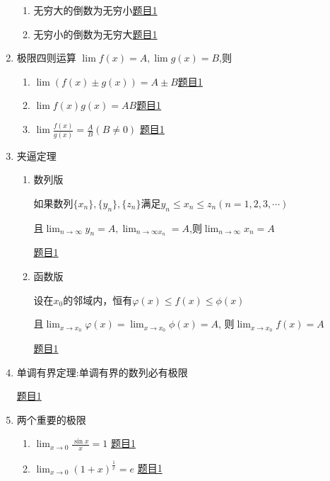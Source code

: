 \documentclass[12pt]{article} %
\begin{document}
\begin{enumerate}
\begin{enumerate}
        \item 无穷大的倒数为无穷小\quad \href{https://www.matongxue.com/matex/2596/react/}{题目1}
        \item 无穷小的倒数为无穷大\quad \href{https://www.matongxue.com/matex/2597/react/}{题目1}
    \end{enumerate}
\item 极限四则运算
    $\lim f(x)=A,\lim g(x)=B$,则
    \begin{enumerate}
        \item $\lim (f(x) \pm g(x))=A \pm B$\quad \href{https://www.matongxue.com/matex/2598/react/}{题目1}
        \item $\lim f(x)g(x)=AB$\quad \href{https://www.matongxue.com/matex/2599/react/}{题目1}
        \item $\displaystyle\lim \frac{f(x)}{g(x)}=\frac{A}{B}(B \neq 0)$
        \quad \href{https://www.matongxue.com/matex/2600/react/}{题目1}
    \end{enumerate}
\item 夹逼定理
    \begin{enumerate} 
        \item 数列版
        \par 如果数列$\{x_n\},\{y_n\},\{z_n\}$满足$y_n\leq x_n \leq z_n(n=1,2,3,\cdots)$
        \par 且$\displaystyle\lim_{n\to\infty}y_n=A,\lim_{n\to\infty x_n}=A$,则$\displaystyle\lim_{n\to\infty}x_n=A$
        \par \href{https://www.matongxue.com/matex/2602/react/}{题目1}
        \item 函数版
        \par 设在$x_0$的邻域内，恒有$\varphi(x)\leq f(x) \leq \phi(x)$
        \par 且$\displaystyle\lim_{x\to x_0}\varphi(x)=\lim_{x\to x_0}\phi(x)=A$,
        则$\displaystyle\lim_{x\to x_0}f(x)=A$
        \par \href{https://www.matongxue.com/matex/2601/react/}{题目1}
    \end{enumerate}
\item 单调有界定理:单调有界的数列必有极限
    \par \href{https://www.matongxue.com/matex/2603/react/}{题目1}
\item 两个重要的极限
    \begin{enumerate}
        \item $\displaystyle\lim_{x\to 0}\frac{\sin x}{x}=1$
        \quad \href{https://www.matongxue.com/matex/2604/react/}{题目1}
        \item $\displaystyle\lim_{x\to 0}(1+x)^{\frac{1}{x}}=e$
        \quad \href{https://www.matongxue.com/matex/2605/react/}{题目1}
    \end{enumerate}
\end{enumerate}
\end{document}

